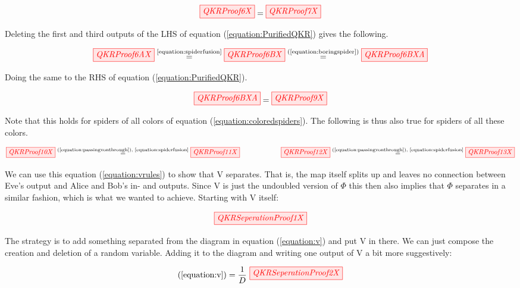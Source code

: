 \documentclass[]{article}
\newcommand{\equaltext}[1]{\ensuremath{\stackrel{\text{#1}}{=}}}
\begin{document}
\begin{equation}
	\label{equation:PurifiedQKR}
	\tikzfig{QKRProof6X} = \tikzfig{QKRProof7X}
\end{equation}

Deleting the first and third outputs of the LHS of equation (\ref{equation:PurifiedQKR}) gives the following.

\begin{equation}
	\tikzfig{QKRProof6AX} \equaltext{\ref{equation:spiderfusion}} \tikzfig{QKRProof6BX} \equaltext{(\ref{equation:boringspider})} \tikzfig{QKRProof6BXA}
\end{equation}

Doing the same to the RHS of equation (\ref{equation:PurifiedQKR}).

\begin{equation}
	\label{equation:passingvonthrough}
	 \tikzfig{QKRProof6BXA} = \tikzfig{QKRProof9X}
\end{equation}

Note that this holds for spiders of all colors of equation (\ref{equation:coloredspiders}). The following is thus also true for spiders of all these colors.

\begin{equation}
\label{equation:vrules}
	\tikzfig{QKRProof10X} \equaltext{(\ref{equation:passingvonthrough}), \ref{equation:spiderfusion}} \tikzfig{QKRProof11X} ~~~~~~~~~~~~~~~~~~ \tikzfig{QKRProof12X} \equaltext{(\ref{equation:passingvonthrough}), \ref{equation:spiderfusion}} \tikzfig{QKRProof13X}
\end{equation}

We can use this equation (\ref{equation:vrules}) to show that V separates. That is, the map itself splits up and leaves no connection between Eve's output and Alice and Bob's in- and outputs. Since V is just the undoubled version of $\Phi$ this then also implies that $\Phi$ separates in a similar fashion, which is what we wanted to achieve. Starting with V itself:

\begin{equation}
	\label{equation:v}
	\tikzfig{QKRSeperationProof1X}
\end{equation}

The strategy is to add something separated from the diagram in equation (\ref{equation:v}) and put V in there. We can just compose the creation and deletion of a random variable. Adding it to the diagram and writing one output of V a bit more suggestively:

\begin{equation}
	\label{equation:vwithpauli}
	(\ref{equation:v}) = \frac{1}{D}~
	\tikzfig{QKRSeperationProof2X}
\end{equation}
\end{document}
